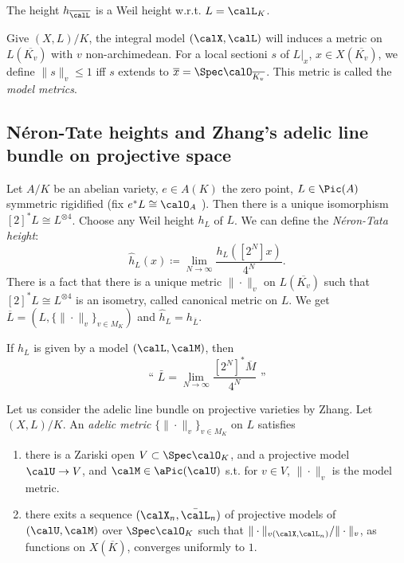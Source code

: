 \begin{remark}[label=\labelNFM{rmk:rmk1}, status=draft, tag=0000000]
	The height $h_{\overline{\calL}}$ is a Weil height w.r.t. $L = \calL_K$.
\end{remark}

\begin{remark}[label=\labelNFM{rmk:rmk2}, status=draft, tag=0000000]
	Give $(X,L)/K$, the integral model $(\calX,\calL)$ will induces a metric on $L(\overline{K_v})$ with $v$ non-archimedean.
	For a local sectioni $s$ of $L|_x$, $x \in X(\overline{K_v})$, we define $\|s\|_v \leq 1$ iff $s$ extends to $\overline{x} = \Spec \calO_{\overline{K_v}}$.
	This metric is called the \emph{model metrics}.
\end{remark}


\subsection[status=draft,tag=0000000,label=\labelNFM{subsec:neron-tate-height}]{N\'eron-Tate heights and Zhang's adelic line bundle on projective space}

Let $A/K$ be an abelian variety, $e \in A(K)$ the zero point, $L \in \Pic(A)$ symmetric rigidified (fix $e^*L \cong \calO_A$ \Yang{}).
Then there is a unique isomorphism $[2]^*L \cong L^{\otimes 4}$.
Choose any Weil height $h_L$ of $L$.
We can define the \emph{N\'eron-Tata height}:
\[ \hat{h}_L(x) \coloneqq \lim_{N \to \infty} \frac{h_L([2^N]x)}{4^N}. \]
There is a fact that there is a unique metric $\|\cdot\|_v$ on $L(\overline{K_v})$ such that $[2]^*L \cong L^{\otimes 4}$ is an isometry, called canonical metric on $L$.
We get $\overline{L} = (L, \{\|\cdot\|_v\}_{v \in M_K})$ and $\hat{h}_L = h_{\bar{L}}$.

If $h_L$ is given by a model $(\calL,\calM)$, then
\[ \text{`` } \bar{L} = \lim_{N \to \infty} \frac{[2^N]^*\overline{M}}{4^N} \text{ ''} \]

Let us consider the adelic line bundle on projective varieties by Zhang.
Let $(X,L)/K$.
An \emph{adelic metric} $\{\|\cdot\|_v\}_{v \in M_K}$ on $L$ satisfies
\begin{enumerate}
	\item there is a Zariski open $V \subset \Spec \calO_K$, and a projective model $\calU \to V$, and $\calM \in \aPic(\calU)$ s.t. for $v \in V$, $\|\cdot\|_v$ is the model metric.
	\item there exits a sequence $(\calX_n,\bar{\calL}_n)$ of projective models of $(\calU,\calM)$ over $\Spec \calO_K$ such that $\|\cdot\|_{v(\calX,\calL_n)}/\|\cdot\|_v$, as functions on $X(\overline{K})$, converges uniformly to $1$.
\end{enumerate}


